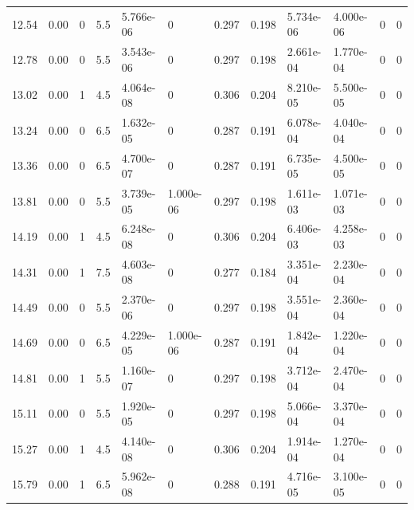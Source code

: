 \documentclass[preview]{standalone}
\begin{document}
{{\begin{tabular}{L{1.2cm}C{1.2cm} C{0.3cm}C{0.5cm} C{1.4cm}C{1.4cm} C{1.4cm}C{1.4cm} C{1.6cm}C{1.6cm} C{1.6cm}C{1.6cm}}
  12.54  &  0.00  & 0     & 5.5 &  5.766e-06  & 0  &  0.297&   0.198& 5.734e-06 & 4.000e-06   &  0 & 0  \\ 
  12.78  &  0.00  & 0     & 5.5 &  3.543e-06  & 0  &  0.297&   0.198& 2.661e-04 & 1.770e-04   &  0 & 0  \\ 
  13.02  &  0.00  & 1     & 4.5 &  4.064e-08  & 0  &  0.306&   0.204& 8.210e-05 & 5.500e-05   &  0 & 0  \\ 
  13.24  &  0.00  & 0     & 6.5 &  1.632e-05  & 0  &  0.287&   0.191& 6.078e-04 & 4.040e-04   &  0 & 0  \\ 
  13.36  &  0.00  & 0     & 6.5 &  4.700e-07  & 0  &  0.287&   0.191& 6.735e-05 & 4.500e-05   &  0 & 0  \\ 
  13.81  &  0.00  & 0     & 5.5 &  3.739e-05  & 1.000e-06  &  0.297&   0.198& 1.611e-03 & 1.071e-03   &  0 & 0  \\ 
  14.19  &  0.00  & 1     & 4.5 &  6.248e-08  & 0  &  0.306&   0.204& 6.406e-03 & 4.258e-03   &  0 & 0  \\ 
  14.31  &  0.00  & 1     & 7.5 &  4.603e-08  & 0  &  0.277&   0.184& 3.351e-04 & 2.230e-04   &  0 & 0  \\ 
  14.49  &  0.00  & 0     & 5.5 &  2.370e-06  & 0  &  0.297&   0.198& 3.551e-04 & 2.360e-04   &  0 & 0  \\ 
  14.69  &  0.00  & 0     & 6.5 &  4.229e-05  & 1.000e-06  &  0.287&   0.191& 1.842e-04 & 1.220e-04   &  0 & 0  \\ 
  14.81  &  0.00  & 1     & 5.5 &  1.160e-07  & 0  &  0.297&   0.198& 3.712e-04 & 2.470e-04   &  0 & 0  \\ 
  15.11  &  0.00  & 0     & 5.5 &  1.920e-05  & 0  &  0.297&   0.198& 5.066e-04 & 3.370e-04   &  0 & 0  \\ 
  15.27  &  0.00  & 1     & 4.5 &  4.140e-08  & 0  &  0.306&   0.204& 1.914e-04 & 1.270e-04   &  0 & 0  \\ 
  15.79  &  0.00  & 1     & 6.5 &  5.962e-08  & 0  &  0.288&   0.191& 4.716e-05 & 3.100e-05   &  0 & 0  \\ 
\hline 
\end{tabular} 

}}
\end{document}
